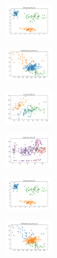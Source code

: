 \begin{figure}[H]
\begin{subfigure}
        \centering
        \includegraphics[width=0.234\textwidth]{img/copkm2/rand_set_const_10_277451237_clust.png}
    \end{subfigure}
    \hfill
    \begin{subfigure}
        \centering
        \includegraphics[width=0.234\textwidth]{img/copkm2/newthyroid_set_const_10_277451237_clust.png}
    \end{subfigure}
    \hfill
    \begin{subfigure}
        \centering
        \includegraphics[width=0.234\textwidth]{img/copkm2/iris_set_const_10_49258669_clust.png}
    \end{subfigure}
    \hfill
    \begin{subfigure}
        \centering
        \includegraphics[width=0.234\textwidth]{img/copkm2/ecoli_set_const_10_49258669_clust.png}
    \end{subfigure}
    \hfill
    \begin{subfigure}
        \centering
        \includegraphics[width=0.234\textwidth]{img/copkm2/rand_set_const_10_49258669_clust.png}
    \end{subfigure}
    \hfill
    \begin{subfigure}
        \centering
        \includegraphics[width=0.234\textwidth]{img/copkm2/newthyroid_set_const_10_49258669_clust.png}

\end{subfigure}
\end{figure}
